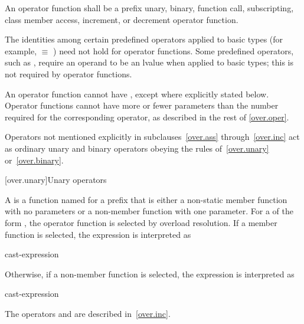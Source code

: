 \pnum
An operator function shall be a
prefix unary, binary, function call, subscripting, class member access, increment, or decrement
operator function.

\pnum
{}%
\begin{note}
The identities among certain predefined operators applied to basic types
(for example,
 $\equiv$
)
need not hold for operator functions.
Some predefined operators, such as
\tcode{+=},
require an operand to be an lvalue when applied to basic types;
this is not required by operator functions.
\end{note}

\pnum
{}%
An operator function cannot have ,
except where explicitly stated below.
Operator
functions cannot have more or fewer parameters than the
number required for the corresponding operator, as
described in the rest of \ref{over.oper}.

\pnum
Operators not mentioned explicitly in subclauses~\ref{over.ass} through~\ref{over.inc}
act as ordinary unary and binary
operators obeying the rules of~\ref{over.unary} or~\ref{over.binary}.%
%

[over.unary]{Unary operators}%
%

\pnum
A 
is a function named 
for a prefix  
that is either
a non-static member function with no parameters or
a non-member function with one parameter.
%
For a 
of the form ,
the operator function is selected by overload resolution.
If a member function is selected,
the expression is interpreted as
\begin{ncsimplebnf}
cast-expression    \terminal{(}\terminal{)}
\end{ncsimplebnf}
Otherwise, if a non-member function is selected,
the expression is interpreted as
\begin{ncsimplebnf}
  \terminal{(} cast-expression \terminal{)}
\end{ncsimplebnf}
\begin{note}
The operators \tcode{++} and \tcode{--}
are described in~\ref{over.inc}.
\end{note}

